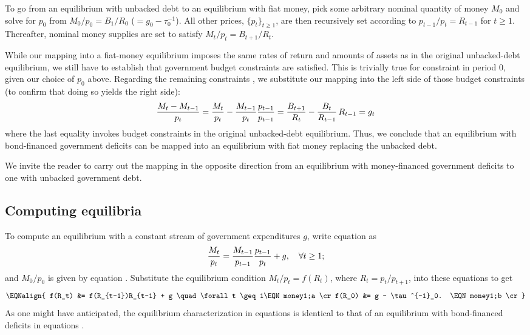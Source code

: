To go from an equilibrium with unbacked debt to an equilibrium 
with fiat money, pick some arbitrary nominal quantity of 
money $M_0$ and solve for $p_0$ from $M_0/p_0=B_1/R_0$ ($= g_0-\tau^{-1}_0$). 
All other prices, $\{p_t\}_{t\geq 1}$, are then recursively set
according to $p_{t-1}/p_t=R_{t-1}$ for $t\geq 1$. Thereafter,
nominal money supplies are set to satisfy 
$M_t / p_t = B_{t+1} / R_t$.

While our mapping into a fiat-money equilibrium imposes the same 
rates of return and amounts of assets as in the original 
unbacked-debt equilibrium, we still have to establish that
government budget constraints  are satisfied. 
This is trivially true for constraint  in 
period $0$, given our choice of $p_0$ above. Regarding the 
remaining constraints , we substitute our 
mapping into the left side of those budget constraints
(to confirm that doing so yields the right side):
$${M_t - M_{t-1} \over p_t} = {M_t \over p_t} 
                            - {M_{t-1} \over p_t} {p_{t-1} \over p_{t-1}}
                            = {B_{t+1} \over R_t} 
                            - {B_t \over R_{t-1}}\,R_{t-1} 
                            = g_t 
$$
where the last equality invokes budget constraints 
 in the original unbacked-debt equilibrium.
Thus, we conclude that an equilibrium with bond-financed
government deficits can be mapped into an equilibrium with
fiat money replacing the unbacked debt. 

We invite the
reader to carry out the mapping in the opposite direction
from an equilibrium with money-financed government
deficits to one with unbacked government debt.


\subsection{Computing equilibria}
To compute an equilibrium with a constant stream of
government expenditures $g$, write equation  as
$$ {M_t \over  p_t} = {M_{t-1} \over p_{t-1} }  {p_{t-1} \over p_t}
     + g,  \quad \forall t \geq 1;$$
and ${M_0 / p_0}$ is given by equation .
Substitute the equilibrium condition $M_t / p_t = f(R_t)$, where
$R_t=p_t/p_{t+1}$, into these equations to
get
$$\EQNalign{ f(R_t) &= f(R_{t-1})R_{t-1} + g  \quad 
                             \forall t \geq 1\EQN money1;a \cr
             f(R_0) &=  g - \tau^{-1}_0. \EQN money1;b \cr}
$$
As one might have anticipated, the equilibrium characterization
in equations  is identical
to that of an equilibrium with bond-financed deficits
in equations .

